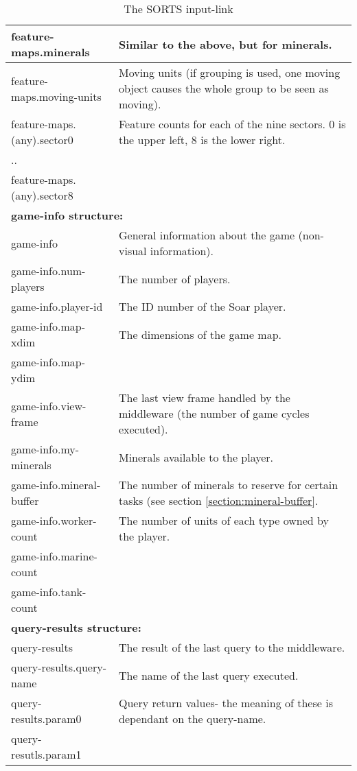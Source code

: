 \begin{center}
\begin{table}
\begin{tabular}{|l|p{4.0in}|}
\hline
feature-maps.minerals & Similar to the above, but for minerals.\\
\hline
feature-maps.moving-units & Moving units (if grouping is used, one moving object causes the whole group to be seen as moving).\\
\hline
feature-maps.(any).sector0 & Feature counts for each of the nine sectors. 0 is the upper left, 8 is the lower right.\\
.. & \\
feature-maps.(any).sector8 & \\
\hline
\multicolumn{2}{|l|}{\textbf{game-info structure:}}\\ 
\hline
game-info & General information about the game (non-visual information).\\
\hline
game-info.num-players & The number of players.\\
\hline
game-info.player-id & The ID number of the Soar player.\\
\hline
game-info.map-xdim & The dimensions of the game map. \\
game-info.map-ydim & \\
\hline
game-info.view-frame & The last view frame handled by the middleware (the number of game cycles executed).\\
\hline
game-info.my-minerals & Minerals available to the player. \\
\hline
game-info.mineral-buffer & The number of minerals to reserve for certain tasks (see section \ref{section:mineral-buffer}.\\
\hline
game-info.worker-count & The number of units of each type owned by the player. \\
game-info.marine-count & \\
game-info.tank-count & \\
\hline
\multicolumn{2}{|l|}{\textbf{query-results structure:}}\\ 
\hline
query-results & The result of the last query to the middleware.\\
\hline
query-results.query-name & The name of the last query executed.\\
\hline
query-results.param0 & Query return values- the meaning of these is dependant on the query-name. \\
query-resutls.param1 & \\
\hline
\end{tabular}
\caption{The SORTS input-link}
\label{tb:input-link}
\end{table}


\end{center}
